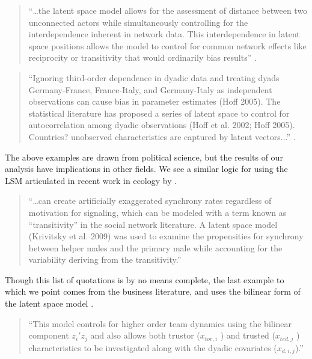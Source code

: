 \documentclass[11pt]{article}
\begin{document}
\begin{quote}
``\ldots the latent space model allows for the assessment of distance between two unconnected actors while simultaneously controlling for the interdependence inherent in network data. This interdependence in latent space positions allows the model to control for common network effects like reciprocity or transitivity that would ordinarily bias results'' \citep[p. 336]{kirkland2012multimember}.
\end{quote}

\begin{quote}
``Ignoring third-order dependence in dyadic data and treating dyads Germany-France, France-Italy, and Germany-Italy as independent observations can cause bias in parameter estimates (Hoff 2005). The statistical literature has proposed a series of latent space to control for autocorrelation among dyadic observations (Hoff et al. 2002; Hoff 2005). Countries? unobserved characteristics are captured by latent vectors...'' \citep[p. 17]{cao2016transnational}.
\end{quote}


The above examples are drawn from political science, but the results of our analysis have implications in other fields. We see a similar logic for using the LSM articulated in recent work in ecology by \citet[p. 989]{nomano2015unrelated}.

\begin{quote}
``\ldots can create artificially exaggerated synchrony rates regardless of motivation for signaling, which can be modeled with a term known as ``transitivity'' in the social network literature. A latent space model (Krivitsky et al. 2009) was used to examine the propensities for synchrony between helper males and the primary male while accounting for the variability deriving from the transitivity.''
\end{quote}


Though this list of quotations is by no means complete, the last example to which we point comes from the business literature, and uses the bilinear form of the latent space model \citep[p. 7]{dass2011impact}. 

\begin{quote}
``This model controls for higher order team dynamics using the bilinear component $z_i'z_j$ and also allows
both trustor ($x_{tor,i}$ ) and trusted ($x_{ted,j}$ ) characteristics to be investigated along with the dyadic covariates ($x_{d,i,j}$).''
\end{quote}
\end{document}
